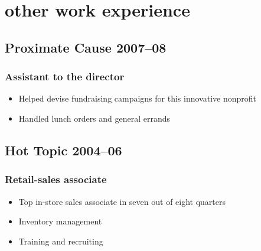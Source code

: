 \documentclass[11pt]{article}
\begin{document}
\section{other work experience}
	\subsection{Proximate Cause \hfill 2007–08}
	\subsubsection{Assistant to the director}
	\begin{itemize}
		\item Helped devise fundraising campaigns for this innovative nonprofit
		\item Handled lunch orders and general errands
	\end{itemize}
	
	\subsection{Hot Topic \hfill 2004–06}
	\subsubsection{Retail-sales associate}
	\begin{itemize}
		\item Top in-store sales associate in seven out of eight quarters
		\item Inventory management
		\item Training and recruiting
	\end{itemize}
	
\end{document}
